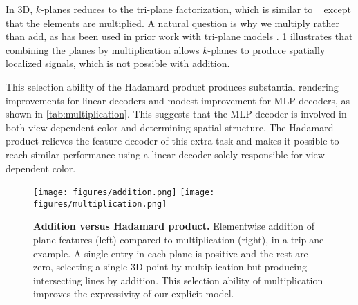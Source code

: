\documentclass[10pt,twocolumn,letterpaper]{article}
\makeatletter
\newcommand{\modelname}{$k$-planes}
\renewcommand{\paragraph}{\@startsection{paragraph}{4}{\z@}{0.65ex \@plus 1ex \@minus .2ex}{-1em}{\normalfont \normalsize \bfseries }}
\makeatother
\begin{document}
\paragraph{Why Hadamard product?}
\label{sec:hadamard} 
In 3D, \modelname{} reduces to the tri-plane factorization, which is similar to ~\cite{triplane} except that the elements are multiplied. A natural question is why we multiply rather than add, as has been used in prior work with tri-plane models \cite{triplane, convtriplane}.
\cref{fig:multiplication} illustrates that combining the planes by multiplication allows \modelname{} to produce spatially localized signals, which is not possible with addition.


This selection ability of the Hadamard product produces substantial rendering improvements for linear decoders and modest improvement for MLP decoders, as shown in \cref{tab:multiplication}. This suggests that the MLP decoder is involved in both view-dependent color and determining spatial structure. The Hadamard product relieves the feature decoder of this extra task and makes it possible to reach similar performance using a linear decoder solely responsible for view-dependent color.



\begin{figure}[ht!]
\begin{minipage}[]{1\linewidth}
  \centering
  \texttt{[image: figures/addition.png]}
  \texttt{[image: figures/multiplication.png]}
\end{minipage}
\caption{\textbf{Addition versus Hadamard product.} Elementwise addition of plane features (left) compared to multiplication (right), in a triplane example. A single entry in each plane is positive and the rest are zero, selecting a single 3D point by multiplication but producing intersecting lines by addition. This selection ability of multiplication improves the expressivity of our explicit model.}
\label{fig:multiplication}
\end{figure}


\renewcommand{\tabcolsep}{6pt}
\begin{table}[ht]
  \centering
  \caption{\textbf{Ablation study over Hadamard product.} Multiplication of plane features yields a large improvement in PSNR $\uparrow$ for our explicit model, whereas our hybrid model can use its MLP decoder to partially compensate for the less expressive addition of planes. This experiment uses the static \emph{Lego} scene \cite{nerf} with $3$ scales: $128$, $256$, and $512$, and $32$ features per scale.}
  \label{tab:multiplication}
\end{table}
\end{document}
